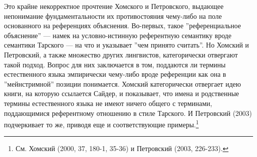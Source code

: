 \documentclass[11pt]{book}
\begin{document}
Это крайне некорректное прочтение Хомского и Петровского, выдающее непонимание фундаментальности их противостояния чему-либо на поле основанного на референциях объяснения. Во-первых, такое ''референциальное объяснение'' --- намек на условно-истинную референтную семантику вроде семантики Тарского --- на что и указывает ''чем принято считать''. Но Хомский и Петровский, а также множество других лингвистов, категорически отвергают такой подход. Вопрос для них заключается в том, поддаются ли термины естественного языка эмпирически чему-либо вроде референции как она в ''мейнстримной'' позиции понимается. Хомский категорически отвергает идею книги, на которую ссылается Сайдер, и показывает, что имена и родственные термины естественного языка не имеют ничего общего с терминами, поддающимися референтному отношению в стиле Тарского. И Петровский (2003) подчеркивает то же, приводя еще и соответствующие примеры.\footnote{См. Хомский (2000, 37, 180-1, 35-36) и Петровский (2003, 226-233).}
\end{document}
